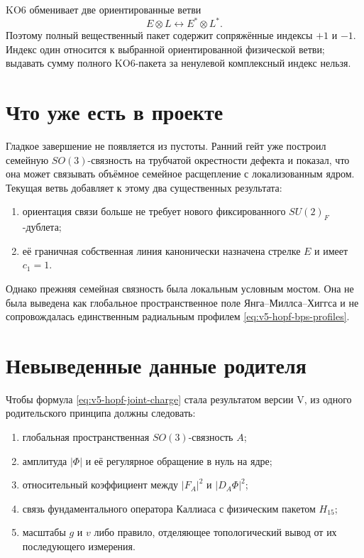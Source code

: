 KO6 обменивает две ориентированные ветви
\begin{equation}
 E\otimes L\longleftrightarrow E^*\otimes L^*.
\end{equation}
Поэтому полный вещественный пакет содержит сопряжённые индексы $+1$ и
$-1$. Индекс один относится к выбранной ориентированной физической
ветви; выдавать сумму полного KO6-пакета за ненулевой комплексный индекс
нельзя.

\section{Что уже есть в проекте}

Гладкое завершение не появляется из пустоты. Ранний гейт
 уже построил семейную
$SO(3)$-связность на трубчатой окрестности дефекта и показал, что она
может связывать объёмное семейное расщепление с локализованным ядром.
Текущая ветвь добавляет к этому два существенных результата:
\begin{enumerate}
 \item ориентация связи больше не требует нового фиксированного
 $SU(2)_F$-дублета;
 \item её граничная собственная линия канонически назначена стрелке
 $E$ и имеет $c_1=1$.
\end{enumerate}

Однако прежняя семейная связность была локальным условным мостом. Она не
была выведена как глобальное пространственное поле Янга--Миллса--Хиггса и
не сопровождалась единственным радиальным профилем
\eqref{eq:v5-hopf-bps-profiles}.

\section{Невыведенные данные родителя}

Чтобы формула \eqref{eq:v5-hopf-joint-charge} стала результатом версии V,
из одного родительского принципа должны следовать:
\begin{enumerate}
 \item глобальная пространственная $SO(3)$-связность $A$;
 \item амплитуда $|\Phi|$ и её регулярное обращение в нуль на ядре;
 \item относительный коэффициент между $|F_A|^2$ и $|D_A\Phi|^2$;
 \item связь фундаментального оператора Каллиаса с физическим пакетом
 $H_{15}$;
 \item масштабы $g$ и $v$ либо правило, отделяющее топологический вывод
 от их последующего измерения.
\end{enumerate}

